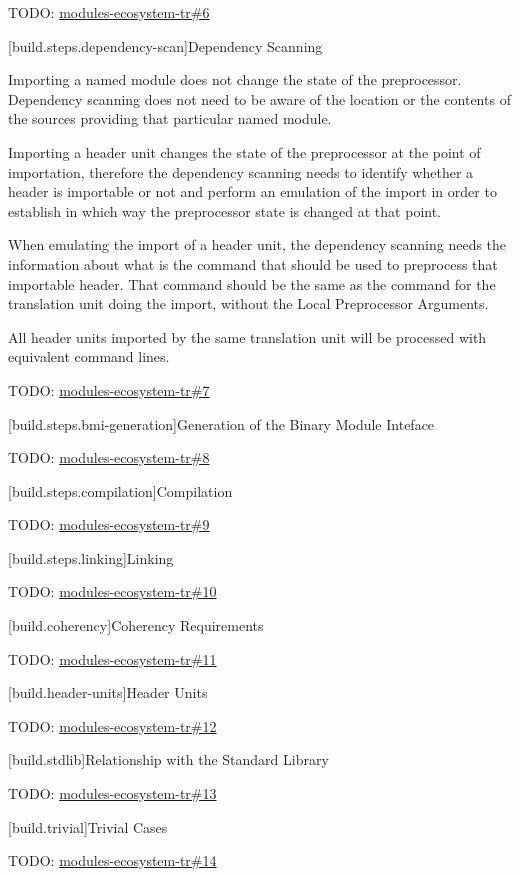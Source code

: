 \pnum TODO: \href{https://github.com/cplusplus/modules-ecosystem-tr/issues/6}{modules-ecosystem-tr\#6}

[build.steps.dependency-scan]{Dependency Scanning}

\pnum Importing a named module does not change the state of the
preprocessor. Dependency scanning does not need to be aware of the
location or the contents of the sources providing that particular
named module.

\pnum Importing a header unit changes the state of the preprocessor at
the point of importation, therefore the dependency scanning needs to
identify whether a header is importable or not and perform an
emulation of the import in order to establish in which way the
preprocessor state is changed at that point.

\pnum When emulating the import of a header unit, the dependency
scanning needs the information about what is the command that should
be used to preprocess that importable header. That command should be
the same as the command for the translation unit doing the import,
without the Local Preprocessor Arguments.

\pnum All header units imported by the same translation unit will be
processed with equivalent command lines.

\pnum TODO: \href{https://github.com/cplusplus/modules-ecosystem-tr/issues/7}{modules-ecosystem-tr\#7}

[build.steps.bmi-generation]{Generation of the Binary Module Inteface}

\pnum TODO: \href{https://github.com/cplusplus/modules-ecosystem-tr/issues/8}{modules-ecosystem-tr\#8}

[build.steps.compilation]{Compilation}

\pnum TODO: \href{https://github.com/cplusplus/modules-ecosystem-tr/issues/9}{modules-ecosystem-tr\#9}

[build.steps.linking]{Linking}

\pnum TODO: \href{https://github.com/cplusplus/modules-ecosystem-tr/issues/10}{modules-ecosystem-tr\#10}

[build.coherency]{Coherency Requirements}

\pnum TODO: \href{https://github.com/cplusplus/modules-ecosystem-tr/issues/11}{modules-ecosystem-tr\#11}

[build.header-units]{Header Units}

\pnum TODO: \href{https://github.com/cplusplus/modules-ecosystem-tr/issues/12}{modules-ecosystem-tr\#12}

[build.stdlib]{Relationship with the Standard Library}

\pnum TODO: \href{https://github.com/cplusplus/modules-ecosystem-tr/issues/13}{modules-ecosystem-tr\#13}

[build.trivial]{Trivial Cases}

\pnum TODO: \href{https://github.com/cplusplus/modules-ecosystem-tr/issues/14}{modules-ecosystem-tr\#14}

%
